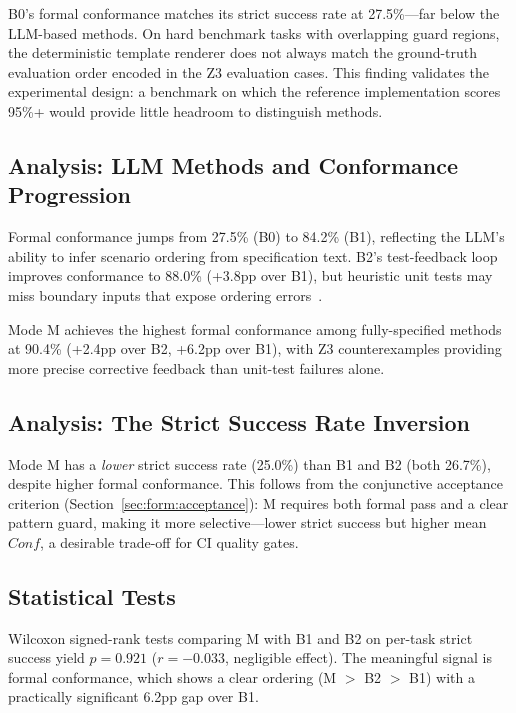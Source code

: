 B0's formal conformance matches its strict success rate at 27.5\%---far below the
LLM-based methods.  On hard benchmark tasks with overlapping guard regions, the
deterministic template renderer does not always match the ground-truth evaluation
order encoded in the Z3 evaluation cases.  This finding validates the experimental
design: a benchmark on which the reference implementation scores 95\%+ would provide
little headroom to distinguish methods.

\subsection{Analysis: LLM Methods and Conformance Progression}

Formal conformance jumps from 27.5\% (B0) to 84.2\% (B1), reflecting the LLM's
ability to infer scenario ordering from specification text.  B2's test-feedback loop
improves conformance to 88.0\% (+3.8pp over B1), but heuristic unit tests may miss
boundary inputs that expose ordering errors~\citep{claessen2000quickcheck}.

Mode M achieves the highest formal conformance among fully-specified methods at
90.4\% (+2.4pp over B2, +6.2pp over B1), with Z3 counterexamples providing more
precise corrective feedback than unit-test failures alone.

\subsection{Analysis: The Strict Success Rate Inversion}

Mode M has a \emph{lower} strict success rate (25.0\%) than B1 and B2 (both 26.7\%),
despite higher formal conformance.  This follows from the conjunctive acceptance
criterion (Section~\ref{sec:form:acceptance}): M requires both formal pass and a
clear pattern guard, making it more selective---lower strict success but higher mean
$\mathit{Conf}$, a desirable trade-off for CI quality gates.

\subsection{Statistical Tests}

Wilcoxon signed-rank tests comparing M with B1 and B2 on per-task strict success
yield $p = 0.921$ ($r = -0.033$, negligible effect).  The meaningful signal is
formal conformance, which shows a clear ordering (M $>$ B2 $>$ B1) with a practically
significant 6.2pp gap over B1.


